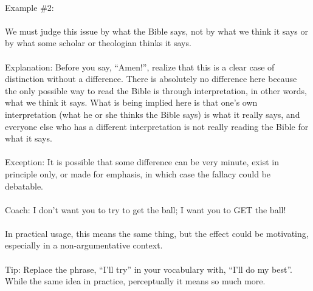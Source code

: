 \documentclass[a4paper,12pt,single,pdftex]{scrbook}
\begin{document}
    
      
    \\

    
      Example \#2:
    \\

    
      
    \\

    
      We must judge this issue by what the Bible says, not by what we think it says or by what some scholar or theologian thinks it says.
    \\

    
      
    \\

    
      Explanation: Before you say, “Amen!”, realize that this is a clear case of distinction without a difference.  There is absolutely no difference here because the only possible way to read the Bible is through interpretation, in other words, what we think it says.  What is being implied here is that one's own interpretation (what he or she thinks the Bible says) is what it really says, and everyone else who has a different interpretation is not really reading the Bible for what it says.
    \\

    
      
    \\

    
      Exception: It is possible that some difference can be very minute, exist in principle only, or made for emphasis, in which case the fallacy could be debatable.
    \\

    
      
    \\

    
      Coach:  I don’t want you to try to get the ball; I want you to GET the ball!
    \\

    
      
    \\

    
      In practical usage, this means the same thing, but the effect could be motivating, especially in a non-argumentative context.
    \\

    
      
    \\

    
      Tip: Replace the phrase, “I’ll try” in your vocabulary with, “I’ll do my best”.  While the same idea in practice, perceptually it means so much more.
    \\
\end{document}
